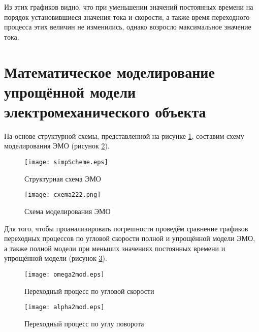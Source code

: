 \documentclass[12pt,a4paper]{article}
\begin{document}
Из этих графиков видно, что при уменьшении значений постоянных времени на порядок установившиеся значения тока и скорости, а также время переходного процесса этих величин не изменились, однако возросло максимальное значение тока.

\newpage
\section{Математическое моделирование упрощённой модели электромеханического объекта}	 
На основе структурной схемы, представленной на рисунке \ref{simpScheme}, составим схему моделирования ЭМО (рисунок \ref{cxema2}).
\begin{figure}[ht!]
	\centering
	\texttt{[image: simpScheme.eps]}
	\caption{Структурная схема ЭМО}
	\label{simpScheme}
\end{figure}
\begin{figure}[ht!]
	\centering
	\texttt{[image: cxema222.png]}
	\caption{Схема моделирования ЭМО}
	\label{cxema2}
\end{figure}

Для того, чтобы проанализировать погрешности проведём сравнение графиков переходных процессов по угловой скорости полной и упрощённой модели ЭМО, а также полной модели при меньших значениях постоянных времени и упрощённой модели (рисунок \ref{sravnenie}). 
\begin{figure}[H]	
	 \centering
	\texttt{[image: omega2mod.eps]}
	\caption{Переходный процесс по угловой скорости}
\end{figure}
\begin{figure}[H]
	 \centering
	\texttt{[image: alpha2mod.eps]}
	\caption{Переходный процесс по углу поворота}

	\label{sravnenie}
\end{figure}

\newpage
\end{document}
